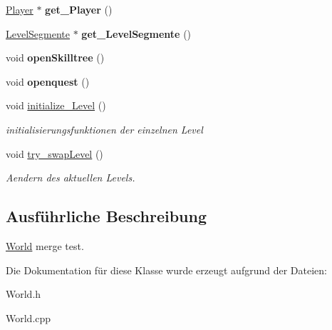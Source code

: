 \begin{DoxyCompactItemize}
\item 
\hypertarget{class_world_af0d1ca602664a0a005cf1521b6aee784}{\hyperlink{class_player}{Player} $\ast$ {\bfseries get\-\_\-\-Player} ()}\label{class_world_af0d1ca602664a0a005cf1521b6aee784}

\item 
\hypertarget{class_world_affdfa76f27683180d8103b297ae6972c}{\hyperlink{class_level_segmente}{Level\-Segmente} $\ast$ {\bfseries get\-\_\-\-Level\-Segmente} ()}\label{class_world_affdfa76f27683180d8103b297ae6972c}

\item 
\hypertarget{class_world_aae955513a6b43da75bebbaf0022efcc3}{void {\bfseries open\-Skilltree} ()}\label{class_world_aae955513a6b43da75bebbaf0022efcc3}

\item 
\hypertarget{class_world_a503eb92ca22d62edfba5caaa405b7ff7}{void {\bfseries openquest} ()}\label{class_world_a503eb92ca22d62edfba5caaa405b7ff7}

\item 
\hypertarget{class_world_a862716ca9282cf7f64522fd819427498}{void \hyperlink{class_world_a862716ca9282cf7f64522fd819427498}{initialize\-\_\-\-Level} ()}\label{class_world_a862716ca9282cf7f64522fd819427498}

\begin{DoxyCompactList}\small\item\em initialisierungsfunktionen der einzelnen Level \end{DoxyCompactList}\item 
\hypertarget{class_world_a227f2998664ae3586190752920ee2713}{void \hyperlink{class_world_a227f2998664ae3586190752920ee2713}{try\-\_\-swap\-Level} ()}\label{class_world_a227f2998664ae3586190752920ee2713}

\begin{DoxyCompactList}\small\item\em Aendern des aktuellen Levels. \end{DoxyCompactList}\end{DoxyCompactItemize}


\subsection{Ausführliche Beschreibung}
\hyperlink{class_world}{World} merge test. 

Die Dokumentation für diese Klasse wurde erzeugt aufgrund der Dateien\-:\begin{DoxyCompactItemize}
\item 
World.\-h\item 
World.\-cpp\end{DoxyCompactItemize}
